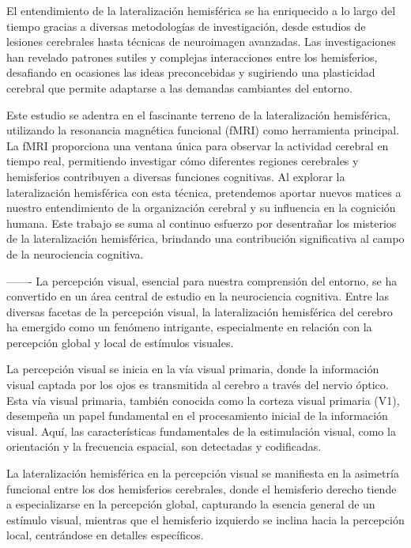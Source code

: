 \documentclass{article}
\begin{document}
	El entendimiento de la lateralización hemisférica se ha enriquecido a lo largo del tiempo gracias a diversas metodologías de investigación, desde estudios de lesiones cerebrales hasta técnicas de neuroimagen avanzadas. Las investigaciones han revelado patrones sutiles y complejas interacciones entre los hemisferios, desafiando en ocasiones las ideas preconcebidas y sugiriendo una plasticidad cerebral que permite adaptarse a las demandas cambiantes del entorno.
	
	Este estudio se adentra en el fascinante terreno de la lateralización hemisférica, utilizando la resonancia magnética funcional (fMRI) como herramienta principal. La fMRI proporciona una ventana única para observar la actividad cerebral en tiempo real, permitiendo investigar cómo diferentes regiones cerebrales y hemisferios contribuyen a diversas funciones cognitivas. Al explorar la lateralización hemisférica con esta técnica, pretendemos aportar nuevos matices a nuestro entendimiento de la organización cerebral y su influencia en la cognición humana. Este trabajo se suma al continuo esfuerzo por desentrañar los misterios de la lateralización hemisférica, brindando una contribución significativa al campo de la neurociencia cognitiva.
	
	-------
	La percepción visual, esencial para nuestra comprensión del entorno, se ha convertido en un área central de estudio en la neurociencia cognitiva. Entre las diversas facetas de la percepción visual, la lateralización hemisférica del cerebro ha emergido como un fenómeno intrigante, especialmente en relación con la percepción global y local de estímulos visuales.
	
	La percepción visual se inicia en la vía visual primaria, donde la información visual captada por los ojos es transmitida al cerebro a través del nervio óptico. Esta vía visual primaria, también conocida como la corteza visual primaria (V1), desempeña un papel fundamental en el procesamiento inicial de la información visual. Aquí, las características fundamentales de la estimulación visual, como la orientación y la frecuencia espacial, son detectadas y codificadas.
	
	La lateralización hemisférica en la percepción visual se manifiesta en la asimetría funcional entre los dos hemisferios cerebrales, donde el hemisferio derecho tiende a especializarse en la percepción global, capturando la esencia general de un estímulo visual, mientras que el hemisferio izquierdo se inclina hacia la percepción local, centrándose en detalles específicos.
	
\end{document}
